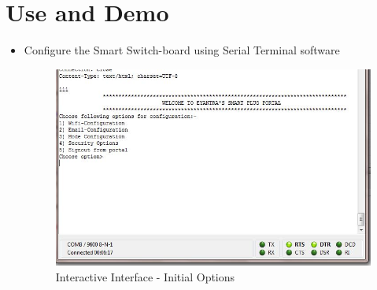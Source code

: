 \documentclass[a4paper,12pt,oneside]{book}
\begin{document}
\section{Use and Demo}
\begin{itemize}
	\item{Configure the Smart Switch-board using Serial Terminal software}
	
	\begin{figure}[H]  \centering
		\includegraphics[width=13cm]{coolterm2.jpg}
		\caption{Interactive Interface - Initial Options}
		\label{34}
		

\end{figure}
\end{itemize}
\end{document}
